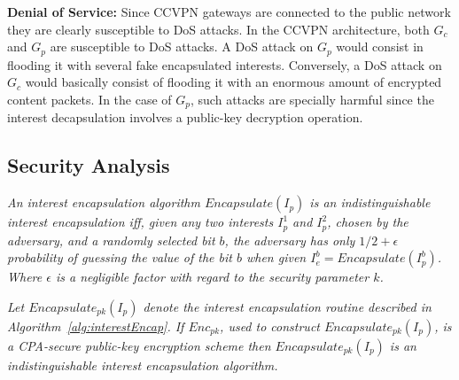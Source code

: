 \textbf{Denial of Service:} Since CCVPN gateways are connected to the public network they are clearly susceptible to DoS attacks. In the CCVPN architecture, both $G_c$ and $G_p$ are susceptible to DoS attacks. A DoS attack on $G_p$ would consist in flooding it with several fake encapsulated interests. Conversely, a DoS attack on $G_c$ would basically consist of flooding it with an enormous amount of encrypted content packets. In the case of $G_p$, such attacks are specially harmful since the interest decapsulation involves a public-key decryption operation.

\subsection{Security Analysis}


\begin{definition}\label{def1}
\textit{
An interest encapsulation algorithm $Encapsulate(I_p)$ is an indistinguishable interest encapsulation iff, given any two interests $I_p^1$ and $I_p^2$, chosen by the adversary, and a randomly selected bit $b$, the adversary has only $1/2 + \epsilon$ probability of guessing the value of the bit $b$ when given $I_e^b = Encapsulate(I_p^b)$. Where $\epsilon$ is a negligible factor with regard to the security parameter $k$.
}
\end{definition}

\begin{theorem}\label{theo1}
\textit{
Let $Encapsulate_{pk}(I_p)$ denote the interest encapsulation routine described in Algorithm~\ref{alg:interestEncap}. If $Enc_{pk}$, used to construct $Encapsulate_{pk}(I_p)$, is a CPA-secure public-key encryption scheme then $Encapsulate_{pk}(I_p)$ is an indistinguishable interest encapsulation algorithm.
}
\end{theorem}


